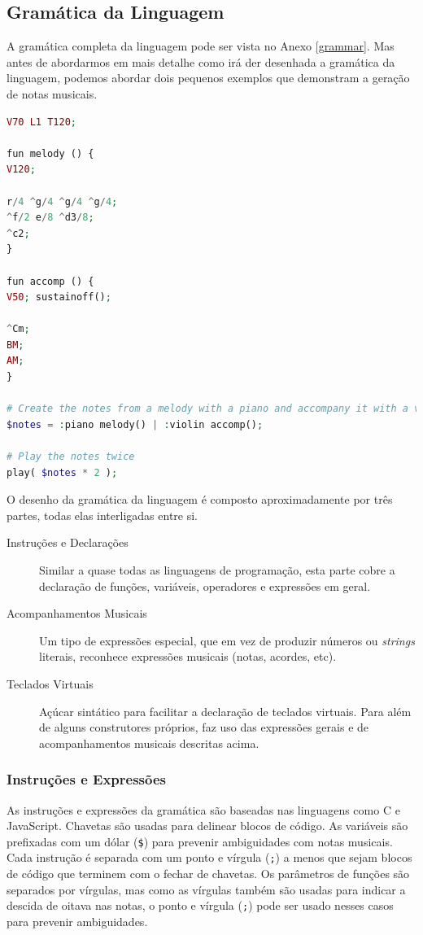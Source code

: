 \subsection{Gramática da Linguagem}
A gramática completa da linguagem pode ser vista no Anexo \ref{grammar}. Mas antes de abordarmos em mais detalhe como irá der desenhada a gramática da linguagem, podemos abordar dois pequenos exemplos que demonstram a geração de notas musicais.
\begin{lstlisting}[caption=Exemplo da sintaxe proposta da linguagem,language=PHP]
V70 L1 T120;

fun melody () {
V120;

r/4 ^g/4 ^g/4 ^g/4;
^f/2 e/8 ^d3/8; 
^c2;
}

fun accomp () {
V50; sustainoff();

^Cm;
BM; 
AM;
}

# Create the notes from a melody with a piano and accompany it with a violin in parallel
$notes = :piano melody() | :violin accomp();

# Play the notes twice
play( $notes * 2 );
\end{lstlisting}

O desenho da gramática da linguagem é composto aproximadamente por três partes, todas elas interligadas entre si.
\begin{description}
    \item[Instruções e Declarações] Similar a quase todas as linguagens de programação, esta parte cobre a declaração de funções, variáveis, operadores e expressões em geral.
    \item[Acompanhamentos Musicais] Um tipo de expressões especial, que em vez de produzir números ou \textit{strings} literais, reconhece expressões musicais (notas, acordes, etc).
    \item[Teclados Virtuais] Açúcar sintático para facilitar a declaração de teclados virtuais. Para além de alguns construtores próprios, faz uso das expressões gerais e de acompanhamentos musicais descritas acima.
\end{description}

\subsubsection{Instruções e Expressões}
As instruções e expressões da gramática são baseadas nas linguagens como C e JavaScript. Chavetas são usadas para delinear blocos de código. As variáveis são prefixadas com um dólar (\texttt{\$}) para prevenir ambiguidades com notas musicais. Cada instrução é separada com um ponto e vírgula (\texttt{;}) a menos que sejam blocos de código que terminem com o fechar de chavetas. Os parâmetros de funções são separados por vírgulas, mas como as vírgulas também são usadas para indicar a descida de oitava nas notas, o ponto e vírgula (\texttt{;}) pode ser usado nesses casos para prevenir ambiguidades.

